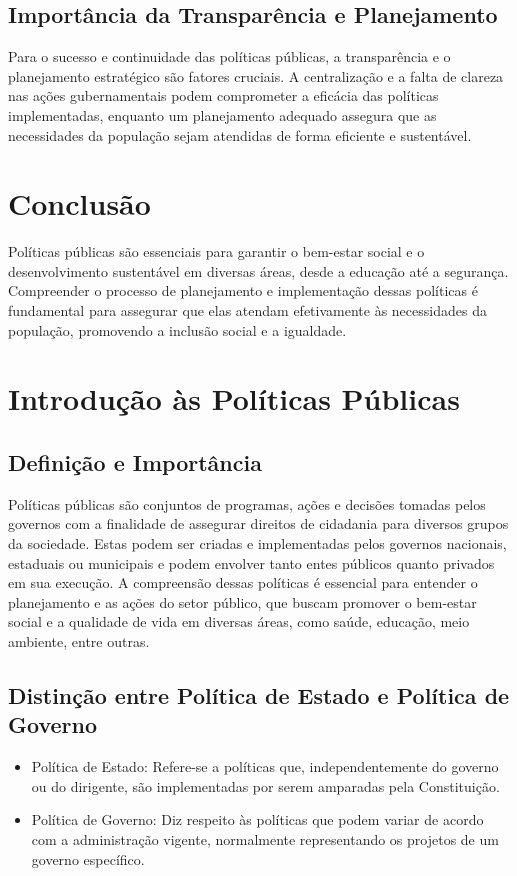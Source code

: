 \documentclass[
   article,       
   12pt,          
   oneside,       
   a4paper,       
   english,       
   brazil,        
   sumario=tradicional
   ]{abntex2}
\begin{document}
\subsection{Importância da Transparência e Planejamento}
Para o sucesso e continuidade das políticas públicas, a transparência e o planejamento estratégico são fatores cruciais. A centralização e a falta de clareza nas ações gubernamentais podem comprometer a eficácia das políticas implementadas, enquanto um planejamento adequado assegura que as necessidades da população sejam atendidas de forma eficiente e sustentável.

\section{Conclusão}
Políticas públicas são essenciais para garantir o bem-estar social e o desenvolvimento sustentável em diversas áreas, desde a educação até a segurança. Compreender o processo de planejamento e implementação dessas políticas é fundamental para assegurar que elas atendam efetivamente às necessidades da população, promovendo a inclusão social e a igualdade.
\section{Introdução às Políticas Públicas}
\subsection{Definição e Importância}
Políticas públicas são conjuntos de programas, ações e decisões tomadas pelos governos com a finalidade de assegurar direitos de cidadania para diversos grupos da sociedade. Estas podem ser criadas e implementadas pelos governos nacionais, estaduais ou municipais e podem envolver tanto entes públicos quanto privados em sua execução. A compreensão dessas políticas é essencial para entender o planejamento e as ações do setor público, que buscam promover o bem-estar social e a qualidade de vida em diversas áreas, como saúde, educação, meio ambiente, entre outras.

\subsection{Distinção entre Política de Estado e Política de Governo}
\begin{itemize}
\item Política de Estado: Refere-se a políticas que, independentemente do governo ou do dirigente, são implementadas por serem amparadas pela Constituição.
\item Política de Governo: Diz respeito às políticas que podem variar de acordo com a administração vigente, normalmente representando os projetos de um governo específico.
\end{itemize}
\end{document}
